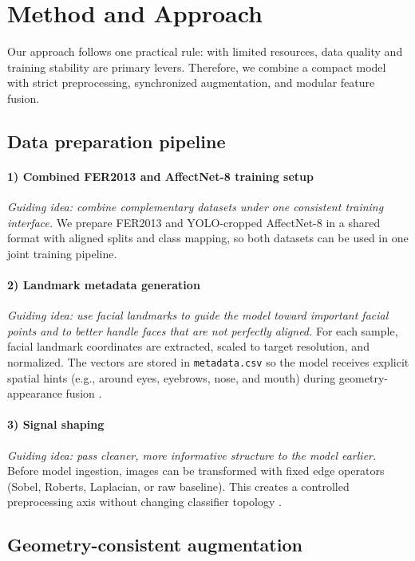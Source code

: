 \section{Method and Approach}
\label{sec:data}

Our approach follows one practical rule: with limited resources, data quality and training stability are primary levers.
Therefore, we combine a compact model with strict preprocessing, synchronized augmentation, and modular feature fusion.

\subsection{Data preparation pipeline}

\paragraph{1) Combined FER2013 and AffectNet-8 training setup}
\textit{Guiding idea: combine complementary datasets under one consistent training interface.}
We prepare FER2013 and YOLO-cropped AffectNet-8 in a shared format with aligned splits and class mapping,
so both datasets can be used in one joint training pipeline.

\paragraph{2) Landmark metadata generation}
\textit{Guiding idea: use facial landmarks to guide the model toward important facial points and to better handle faces that are not perfectly aligned.}
For each sample, facial landmark coordinates are extracted, scaled to target resolution, and normalized.
The vectors are stored in \texttt{metadata.csv} so the model receives explicit spatial hints (e.g., around eyes, eyebrows, nose, and mouth) during geometry-appearance fusion \cite{bulat2017far}.

\paragraph{3) Signal shaping}
\textit{Guiding idea: pass cleaner, more informative structure to the model earlier.}
Before model ingestion, images can be transformed with fixed edge operators (Sobel, Roberts, Laplacian, or raw baseline).
This creates a controlled preprocessing axis without changing classifier topology \cite{sobel1968isotropic}.

\subsection{Geometry-consistent augmentation}

